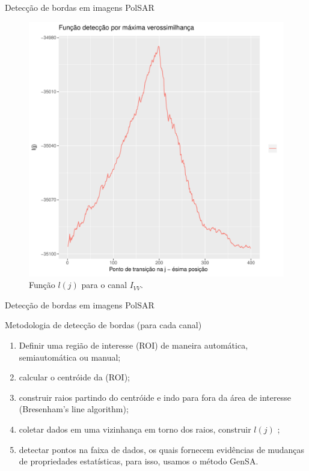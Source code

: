 \documentclass[10pt]{beamer}
\begin{document}
\begin{frame}{Detecção de bordas em imagens PolSAR}
\begin{figure}[hbt]
	\caption{Função $l(j)$ para o canal $I_{HV}$.}
\endminipage\hfill
{}
  \includegraphics[width=\linewidth]{grafico_l_nhfc_2014_sigmavv.pdf}
	\caption{Função $l(j)$ para o canal $I_{VV}$.}
\endminipage\hfill
\end{figure}
\end{frame}
\begin{frame}{Detecção de bordas em imagens PolSAR}
\begin{alertblock}{Metodologia de detecção de bordas (para cada canal)}
\begin{enumerate}
    \item Definir uma região de interesse (ROI) de maneira automática, semiautomática ou manual;
	\item calcular o centróide da (ROI); 
	\item construir raios partindo do centróide e indo para fora da área de interesse (Bresenham's line algorithm);
	\item coletar dados em uma vizinhança em torno dos raios, construir $l(j)$ ;
	\item detectar pontos na faixa de dados, os quais fornecem evidências de mudanças de propriedades estatísticas, para isso, usamos o método GenSA.
\end{enumerate}
\end{alertblock}
\end{frame}
\end{document}
